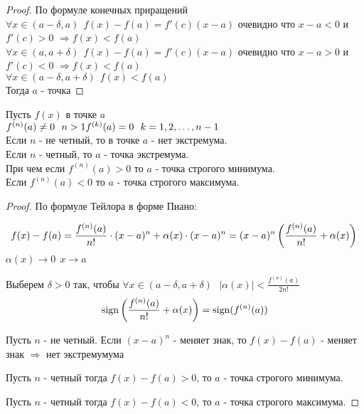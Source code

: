 \begin{proof}
  По формуле конечных приращений\\
  $\forall x \in (a - \delta, a) ~~ f(x) - f(a) = f'(c)(x - a)$ очевидно что
  $x - a < 0$ и \\ $f'(c) > 0$ $\Rightarrow f(x) < f(a)$\\
  $\forall x \in (a, a + \delta) ~~ f(x) - f(a) = f'(c)(x - a)$ очевидно что
  $x - a > 0$ и \\ $f'(c) < 0$ $\Rightarrow f(x) < f(a)$\\
  $\forall x \in (a - \delta, a+ \delta) ~~ f(x) < f(a)$\\
  Тогда $a$ - точка 
\end{proof}

\begin{theorem}
  Пусть $f(x)$ в точке $a$\\
  $f^{(n)} (a) \neq 0 ~~ n > 1\\
  f^{(k)} (a) = 0 ~~ k = 1, 2, \ldots, n-1$\\
  Если $n$ - не четный, то в точке $a$ - нет экстремума.\\
  Если $n$ - четный, то $a$ - точка экстремума.\\
  При чем если $f^{(n)} (a) > 0$ то $a$ - точка строгого минимума.\\
  Если  $f^{(n)} (a) < 0$ то $a$ - точка строгого максимума.
\end{theorem}

\begin{proof}
  По формуле Тейлора в форме Пиано:

  $$
  f(x) - f(a) = \frac{f^{(n)}(a)}{n!} \cdot (x - a)^n + \alpha (x)
  \cdot (x - a)^n = (x - a)^n \left(\frac{f^{(n)}(a)}{n!} + \alpha(x) \right)\\
  $$
  $\alpha (x) \to 0 ~~ x \to a$

  Выберем $\delta > 0$ так, чтобы $\forall x \in
  (a - \delta, a + \delta) ~~~ |\alpha(x)| < \frac{f^{(n)}(a)}{2n!}$
  $$
  \mathrm{sign} \left(\frac{f^{(n)}(a)}{n!} + \alpha(x)\right) = \mathrm{sign} (f^{(n)}(a))
  $$

  Пусть $n$ - не четный. Если $(x - a)^n$ - меняет знак, то
  $f(x) - f(a)$ - меняет знак $\Rightarrow$ нет экстремумума

  Пусть $n$ - четный тогда $f(x) - f(a) > 0$, то $a$ - точка строгого минимума.

  Пусть $n$ - четный тогда $f(x) - f(a) < 0$, то $a$ - точка строгого максимума.
\end{proof}

